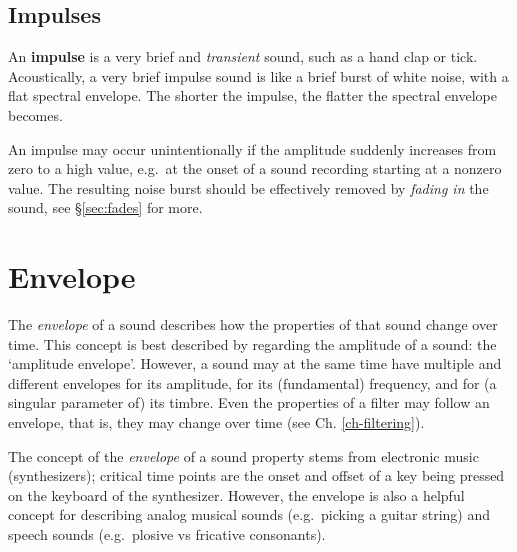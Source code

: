 \documentclass[
]{book}
\begin{document}
\subsection{Impulses}\label{sec:impulses}

An \textbf{impulse} is a very brief and \emph{transient} sound, such as a hand clap or tick. Acoustically, a very brief impulse sound is like a brief burst of white noise, with a flat spectral envelope. The shorter the impulse, the flatter the spectral envelope becomes.

An impulse may occur unintentionally if the amplitude suddenly increases from zero to a high value, e.g.~at the onset of a sound recording starting at a nonzero value. The resulting noise burst should be effectively removed by \emph{fading in} the sound, see §\ref{sec:fades} for more.

\section{Envelope}\label{sec:envelope}

The \emph{envelope} of a sound describes how the properties of that sound change over time. This concept is best described by regarding the amplitude of a sound: the `amplitude envelope'. However, a sound may at the same time have multiple and different envelopes for its amplitude, for its (fundamental) frequency, and for (a singular parameter of) its timbre. Even the properties of a filter may follow an envelope, that is, they may change over time (see Ch. \ref{ch-filtering}).

The concept of the \emph{envelope} of a sound property stems from electronic music (synthesizers); critical time points are the onset and offset of a key being pressed on the keyboard of the synthesizer. However, the envelope is also a helpful concept for describing analog musical sounds (e.g.~picking a guitar string) and speech sounds (e.g.~plosive vs fricative consonants).
\end{document}
